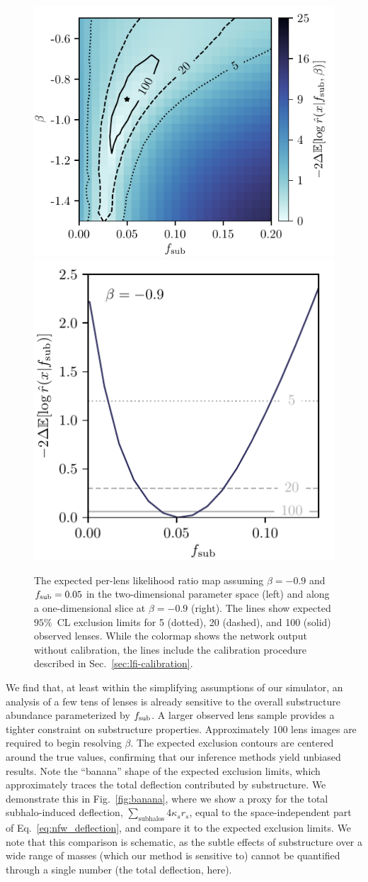 \documentclass[twocolumn]{aastex62}
\begin{document}
\begin{figure}
  \centering
  \includegraphics[height=0.4\textwidth]{figures/expected_likelihood_map}
  \includegraphics[height=0.4\textwidth]{figures/expected_likelihood_slice}
  \caption{The expected per-lens likelihood ratio map assuming $\beta = -0.9$ and $f_{\mathrm{sub}} = 0.05$ in the two-dimensional parameter space (left) and along a one-dimensional slice at $\beta = -0.9$ (right). The lines show expected $95\%$~CL exclusion limits for 5 (dotted), 20 (dashed), and 100 (solid) observed lenses. While the colormap shows the network output without calibration, the lines include the calibration procedure described in Sec.~\ref{sec:lfi-calibration}.}
  \label{fig:expected_likelihood}
\end{figure}

We find that, at least within the simplifying assumptions of our simulator, an analysis of a few tens of lenses is already sensitive to the overall substructure abundance parameterized by $f_{\mathrm{sub}}$. A larger observed lens sample provides a tighter constraint on substructure properties. Approximately 100 lens images are required to begin resolving $\beta$. The expected exclusion contours are centered around the true values, confirming that our inference methods yield unbiased results. Note the ``banana'' shape of the expected exclusion limits, which approximately traces the total deflection contributed by substructure. We demonstrate this in Fig.~\ref{fig:banana}, where we show a proxy for the total subhalo-induced deflection, $\sum_{\text{subhalos}} 4 \kappa_s r_s$, equal to the space-independent part of Eq.~\eqref{eq:nfw_deflection}, and compare it to the expected exclusion limits. We note that this comparison is schematic, as the subtle effects of substructure over a wide range of masses (which our method is sensitive to) cannot be quantified through a single number (the total deflection, here).
\end{document}
